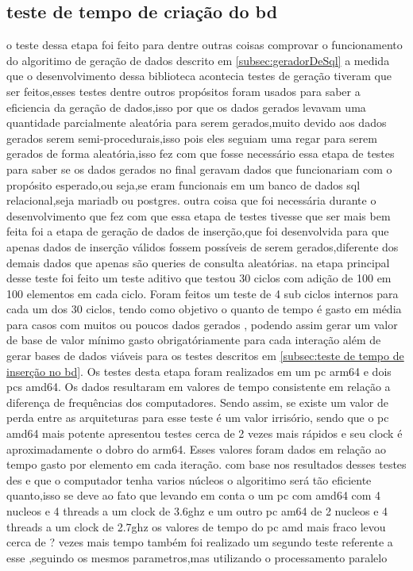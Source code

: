 \documentclass[
	12pt,				%
	openright,			%
	oneside,			%
	a4paper,			%
	english,			%
	french,				%
	spanish,			%
	brazil,				%
	]{abntex2}
\begin{document}
\subsection{teste de tempo de criação do bd}
\label{subsec:teste de tempo de criação do bd}
o teste dessa etapa foi feito para dentre outras coisas comprovar o funcionamento do algoritimo de geração de dados descrito em \autoref{subsec:geradorDeSql} a medida que o desenvolvimento dessa biblioteca acontecia testes de geração tiveram que ser feitos,esses testes dentre outros propósitos foram usados para saber a eficiencia da geração de dados,isso por que os dados gerados levavam uma quantidade parcialmente aleatória para serem gerados,muito devido aos dados gerados serem semi-procedurais,isso pois eles seguiam uma regar para serem gerados de forma aleatória,isso fez com que fosse necessário essa etapa de testes para saber se os dados gerados no final geravam dados que funcionariam com o propósito esperado,ou seja,se eram funcionais em um banco de dados sql relacional,seja mariadb ou postgres.
outra coisa que foi necessária durante o desenvolvimento que fez com que essa etapa de testes tivesse que ser mais bem feita foi a etapa de geração de dados de inserção,que foi desenvolvida para que apenas dados de inserção válidos fossem possíveis de serem gerados,diferente dos demais dados que apenas são queries de consulta aleatórias.
na etapa principal desse teste foi feito um teste aditivo que testou 30 ciclos com adição de 100 em 100 elementos em cada ciclo. Foram feitos um teste de 4 sub ciclos internos para cada um dos 30 ciclos, tendo como objetivo o quanto de tempo é gasto em média para casos com muitos ou poucos dados gerados , podendo assim gerar um valor de base de valor mínimo gasto obrigatóriamente para cada interação além de gerar bases de dados viáveis para os testes descritos em \autoref{subsec:teste de tempo de inserção no bd}.\newline
Os testes desta etapa foram realizados em um pc arm64 e dois pcs amd64. Os dados resultaram em valores de tempo consistente em relação a diferença de frequências dos computadores. Sendo assim, se existe um valor de perda entre as arquiteturas para esse teste é um valor irrisório, sendo que o pc amd64 mais potente apresentou testes cerca de 2 vezes mais rápidos e seu clock é aproximadamente o dobro do arm64. Esses valores foram dados em relação ao tempo gasto por elemento em cada iteração.
com base nos resultados desses testes des e que o computador tenha varios núcleos o algoritimo será tão eficiente quanto,isso se deve ao fato que levando em conta o um pc com amd64 com 4 nucleos e 4 threads a um clock de 3.6ghz e um outro pc am64 de 2 nucleos e 4 threads a um clock de 2.7ghz os valores de tempo do pc amd mais fraco levou cerca de ? vezes mais tempo
também foi realizado um segundo teste referente a esse ,seguindo os mesmos parametros,mas utilizando o processamento paralelo
\end{document}
